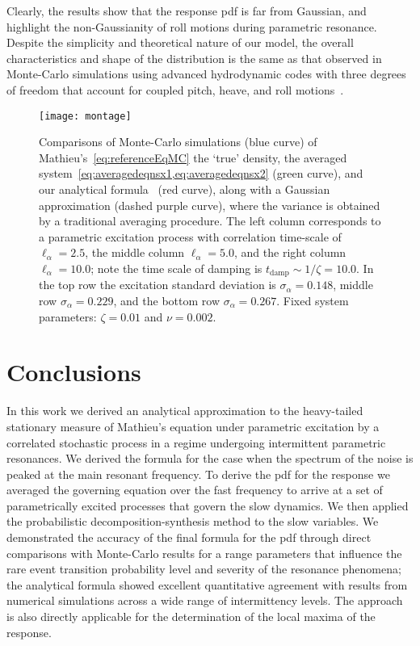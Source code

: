 \documentclass[3p]{elsarticle}
\begin{document}
Clearly, the results show that the response pdf is far from Gaussian, and highlight the    non-Gaussianity of roll motions during parametric resonance. Despite the simplicity and theoretical nature of our model, the overall characteristics and shape of the distribution is the same as that observed in Monte-Carlo simulations using advanced  hydrodynamic codes with three degrees of freedom  that account for coupled pitch, heave, and roll motions~\cite{vadim2011head,belenkyprobprop}.
\begin{figure}[htb]
    \centering
    \texttt{[image: montage]}
    \caption{Comparisons of Monte-Carlo simulations (blue curve) of Mathieu's~\cref{eq:referenceEqMC}  the `true' density, the averaged system~\cref{eq:averagedeqnsx1,eq:averagedeqnsx2} (green curve), and  our analytical formula~ (red curve), along with a  Gaussian approximation (dashed purple curve), where the variance is obtained by a traditional averaging procedure. The left column corresponds to a parametric excitation process with correlation time-scale of $\ell_\alpha = 2.5$, the middle column $\ell_\alpha = 5.0$, and the right column $\ell_\alpha = 10.0$; note the time scale of damping is $t_\text{damp}\sim 1/\zeta = 10.0$. In the top row the excitation standard deviation is $\sigma_\alpha = 0.148$, middle row $\sigma_\alpha = 0.229$, and the bottom row $\sigma_\alpha = 0.267$. Fixed system parameters: $\zeta = 0.01$ and $\nu = 0.002$.}
    \label{fig:results}
\end{figure}


\section{Conclusions}\label{sec:conclusions}

In this work we derived an analytical approximation to the heavy-tailed stationary measure of Mathieu's equation under  parametric excitation by a correlated stochastic process  in a regime undergoing  intermittent parametric resonances.   We derived the formula for the case when the spectrum of the noise is peaked at the main resonant frequency. To derive the pdf for the response we averaged the governing equation over the fast frequency to arrive at a set of parametrically excited   processes that govern the slow dynamics. We then  applied the  probabilistic decomposition-synthesis method to the slow variables.  We demonstrated the accuracy of the final   formula for the pdf  through direct comparisons with Monte-Carlo results for a range parameters that influence the rare event transition probability level and severity of the resonance phenomena; the analytical formula showed excellent quantitative agreement with results from numerical simulations across a wide range of intermittency levels. The approach is also directly applicable for the determination of the local maxima of the response.
\end{document}
